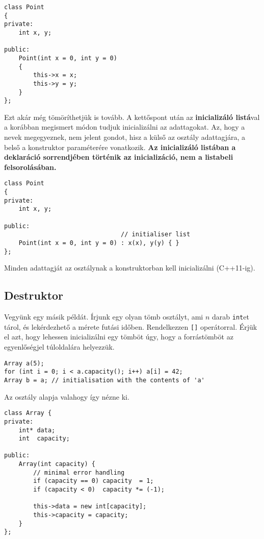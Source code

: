 \documentclass[a4paper, 11pt, oneside]{book}
\begin{document}
\begin{lstlisting}[style=cppstyle]
class Point
{
private:
	int x, y;
	
public:
	Point(int x = 0, int y = 0)
	{
		this->x = x;
		this->y = y;
	}
};
\end{lstlisting}

Ezt akár még tömöríthetjük is tovább. A kettőspont után az \textbf{inicializáló listá}val a korábban megismert módon tudjuk inicializálni az adattagokat. Az, hogy a nevek megegyeznek, nem jelent gondot, hisz a külső az osztály adattagjára, a belső a konstruktor paraméterére vonatkozik. \textbf{Az inicializáló listában a deklaráció sorrendjében történik az inicializáció, nem a listabeli felsorolásában.}

\begin{lstlisting}[style=cppstyle]
class Point
{
private:
	int x, y;
		
public:
								// initialiser list
	Point(int x = 0, int y = 0) : x(x), y(y) { }
};
\end{lstlisting}

Minden adattagját az osztálynak a konstruktorban kell inicializálni (C++11-ig).

\subsection{Destruktor}

Vegyünk egy másik példát. Írjunk egy olyan tömb osztályt, ami $n$ darab \verb*|int|et tárol, és lekérdezhető a mérete futási időben. Rendelkezzen \verb*|[]| operátorral. Érjük el azt, hogy lehessen inicializálni egy tömböt úgy, hogy a forrástömböt az egyenlőségjel túloldalára helyezzük.

\newpage

\begin{lstlisting}[style=cppstyle]
Array a(5);
for (int i = 0; i < a.capacity(); i++) a[i] = 42;
Array b = a; // initialisation with the contents of 'a'
\end{lstlisting}

Az osztály alapja valahogy így nézne ki.

\begin{lstlisting}[style=cppstyle]
class Array {
private:
	int* data;
	int  capacity;

public:
	Array(int capacity) {
		// minimal error handling
		if (capacity == 0) capacity  = 1;
		if (capacity < 0)  capacity *= (-1);
		
		this->data = new int[capacity];
		this->capacity = capacity;
	}
};
\end{lstlisting}
\end{document}
